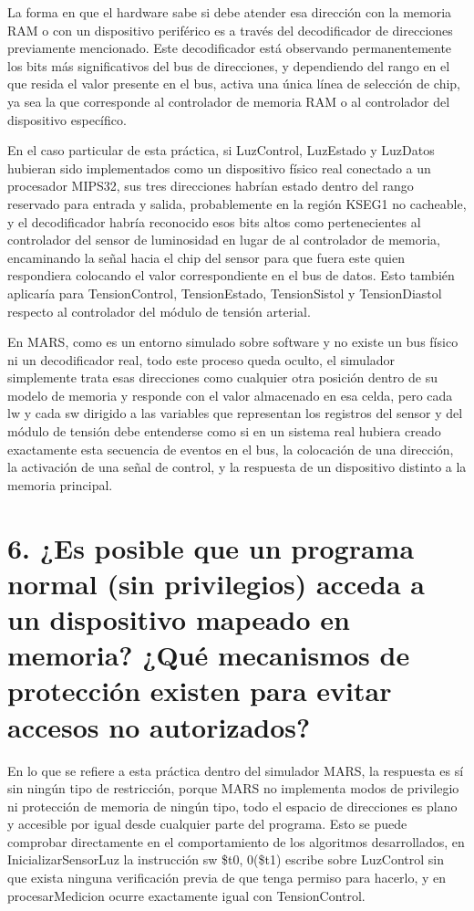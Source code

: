 \documentclass[12pt, letterpaper]{article}
\begin{document}
La forma en que el hardware sabe si debe atender esa dirección con la memoria RAM o con un dispositivo periférico es a través del decodificador de direcciones previamente mencionado. Este decodificador está observando permanentemente los bits más significativos del bus de direcciones, y dependiendo del rango en el que resida el valor presente en el bus, activa una única línea de selección de chip, ya sea la que corresponde al controlador de memoria RAM o al controlador del dispositivo específico.

En el caso particular de esta práctica, si LuzControl, LuzEstado y LuzDatos hubieran sido implementados como un dispositivo físico real conectado a un procesador MIPS32, sus tres direcciones habrían estado dentro del rango reservado para entrada y salida, probablemente en la región KSEG1 no cacheable, y el decodificador habría reconocido esos bits altos como pertenecientes al controlador del sensor de luminosidad en lugar de al controlador de memoria, encaminando la señal hacia el chip del sensor para que fuera este quien respondiera colocando el valor correspondiente en el bus de datos. Esto también aplicaría para TensionControl, TensionEstado, TensionSistol y TensionDiastol respecto al controlador del módulo de tensión arterial.

En MARS, como es un entorno simulado sobre software y no existe un bus físico ni un decodificador real, todo este proceso queda oculto, el simulador simplemente trata esas direcciones como cualquier otra posición dentro de su modelo de memoria y responde con el valor almacenado en esa celda, pero cada lw y cada sw dirigido a las variables que representan los registros del sensor y del módulo de tensión debe entenderse como si en un sistema real hubiera creado exactamente esta secuencia de eventos en el bus, la colocación de una dirección, la activación de una señal de control, y la respuesta de un dispositivo distinto a la memoria principal.\newpage

\section*{6. ¿Es posible que un programa normal (sin privilegios) acceda a un dispositivo mapeado en memoria? ¿Qué mecanismos de protección existen para evitar accesos no autorizados?}

En lo que se refiere a esta práctica dentro del simulador MARS, la respuesta es sí sin ningún tipo de restricción, porque MARS no implementa modos de privilegio ni protección de memoria de ningún tipo, todo el espacio de direcciones es plano y accesible por igual desde cualquier parte del programa. Esto se puede comprobar directamente en el comportamiento de los algoritmos desarrollados, en InicializarSensorLuz la instrucción sw \$t0, 0(\$t1) escribe sobre LuzControl sin que exista ninguna verificación previa de que tenga permiso para hacerlo, y en procesarMedicion ocurre exactamente igual con TensionControl.
\end{document}

